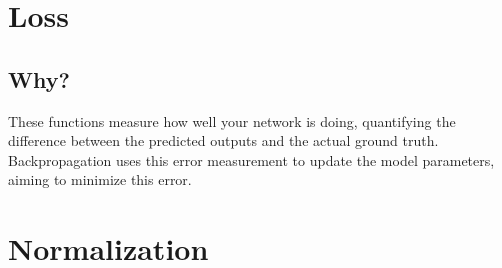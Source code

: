\documentclass[11pt]{article}
\begin{document}
\section{Loss}

\subsection{Why?}

These functions measure how well your network is doing, quantifying the difference between the predicted outputs and the actual ground truth. Backpropagation uses this error measurement to update the model parameters, aiming to minimize this error.

\section{Normalization}
\end{document}
